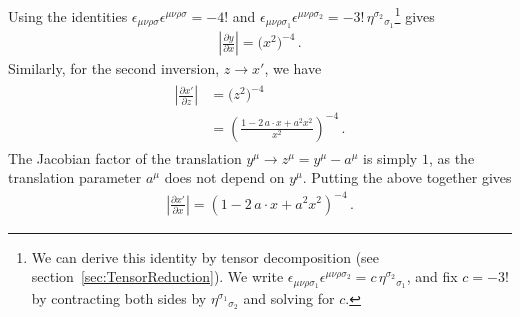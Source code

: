 Using the identities $ \epsilon_{\mu \nu \rho \sigma} \epsilon^{\mu \nu \rho \sigma} = - 4!$ and $ \epsilon_{\mu \nu \rho \sigma_1} \epsilon^{\mu \nu \rho \sigma_2} = - 3! \, \eta^{\sigma_2}{}_{\sigma_1}$\footnote{We can derive this identity by tensor decomposition (see section~\ref{sec:TensorReduction}). We write $ \epsilon_{\mu \nu \rho \sigma_1} \epsilon^{\mu \nu \rho \sigma_2} = c \, \eta^{\sigma_2}{}_{\sigma_1}$, and fix $c=-3!$ by contracting both sides by $\eta^{\sigma_1}{}_{\sigma_2}$ and solving for $c$.} gives
\begin{align}
\left| \frac{\partial y}{\partial x} \right| = \bigl(x^2\bigr)^{-4}  \,.
\end{align}
Similarly, for the second inversion, $z \to x'$, we have 
\begin{align} \begin{aligned}
\left| \frac{\partial x'}{\partial z} \right| & = \bigl(z^2\bigr)^{-4}  \\
& = \left( \frac{1 - 2 \, a \cdot x + a^2 x^2}{x^2} \right)^{-4} \,.
\end{aligned} \end{align}
The Jacobian factor of the translation $y^{\mu} \to z^{\mu} = y^{\mu}-a^{\mu}$ is simply $1$, as the translation parameter $a^{\mu}$ does not depend on $y^{\mu}$. Putting the above together gives
\begin{align}
\left| \frac{\partial x'}{\partial x} \right| =  \left(1 - 2 \, a \cdot x + a^2 x^2\right)^{-4} \,.
\end{align}

